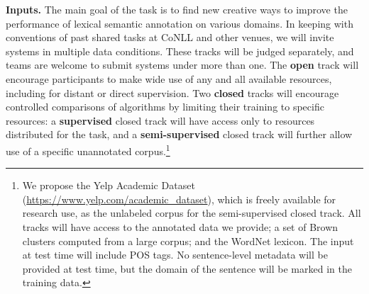 \documentclass[11pt]{article}
\newcommand{\ensuretext}[1]{#1}
\newcommand{\nssmarker}{\ensuretext{\textcolor{magenta}{\ensuremath{^{\textsc{NS}}_{\textsc{S}}}}}}
\newcommand{\arkcomment}[3]{\ensuretext{\textcolor{#3}{[#1 #2]}}}
\newcommand{\nss}[1]{\arkcomment{\nssmarker}{#1}{magenta}}
\newcommand{\shortversion}[1]{#1}
\newcommand{\longversion}[1]{} %
\begin{document}
\textbf{Inputs.}
The main goal of the task is to find new creative ways to improve the performance of lexical semantic annotation on various domains. 
In keeping with conventions of past shared tasks at CoNLL and other venues, 
we will invite systems in multiple data conditions.
These tracks will be judged separately, and teams are welcome to submit systems under more than one.
The \textbf{open} track will encourage participants to make 
wide use of any and all available resources, including for 
distant or direct supervision. 
Two \textbf{closed} tracks will encourage controlled comparisons of algorithms 
by limiting their training to specific resources: 
a \textbf{supervised} closed track will have access only to resources distributed for the task, 
and a \textbf{semi-supervised} closed track will further allow use of a specific unannotated corpus.\footnote{%
We propose the Yelp Academic Dataset (\url{https://www.yelp.com/academic_dataset}), 
which is freely available for research use, as the unlabeled corpus for the semi-supervised closed track.
All tracks will have access to the annotated data we provide; 
a set of Brown clusters \citep{brown-92} computed from a large corpus; and the \longversion{English }WordNet lexicon. 
The input at test time will include \longversion{PTB-style part-of-speech}\shortversion{POS} tags. 
\shortversion{No sentence-level metadata will be provided at test time, 
but the domain of the sentence will be marked in the training data.}}

\longversion{The sentences provided for this task are tokenized. 
For evaluation to be possible, system predictions must respect the input tokenization.}

\longversion{
No sentence-level metadata will be provided in the input at test time.
The training data will mark the domain from which the sentence was drawn 
(\textsc{Reviews} or \textsc{Tweets}); systems can make use of this information as they wish, 
so long as it is not required as part of the input at test time.}
\end{document}
